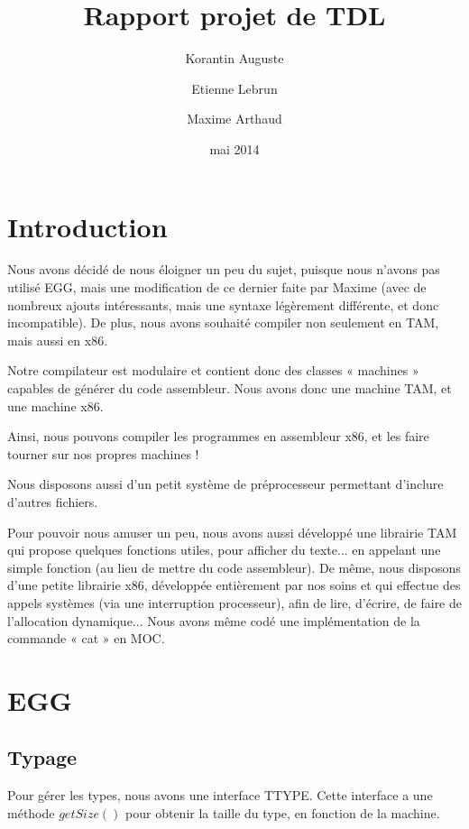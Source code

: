 \documentclass{scrartcl}
\title{Rapport projet de TDL}
\author{Korantin Auguste \and Etienne Lebrun \and Maxime Arthaud}
\date{mai 2014}
\begin{document}
  \maketitle
  \tableofcontents
  \newpage

\section{Introduction}
    Nous avons décidé de nous éloigner un peu du sujet, puisque nous
    n'avons pas utilisé EGG, mais une modification de ce dernier faite
    par Maxime (avec de nombreux ajouts intéressants, mais une syntaxe
    légèrement différente, et donc incompatible).
    De plus, nous avons souhaité compiler non seulement en TAM,
    mais aussi en x86.

    Notre compilateur est modulaire et contient donc des classes « machines » capables de générer du code
    assembleur. Nous avons donc une machine TAM, et une machine x86.

    Ainsi, nous pouvons compiler les programmes en assembleur x86, et les faire tourner sur nos
    propres machines !

    Nous disposons aussi d'un petit système de préprocesseur permettant d'inclure d'autres fichiers.
    
    Pour pouvoir nous amuser un peu, nous avons aussi développé une librairie
    TAM qui propose quelques fonctions utiles, pour afficher du texte... en
    appelant une simple fonction (au lieu de mettre du code assembleur).
    De même, nous disposons d'une petite librairie x86, développée entièrement
    par nos soins et qui effectue des appels systèmes (via une interruption processeur),
    afin de lire, d'écrire, de faire de l'allocation dynamique...
    Nous avons même codé une implémentation de la commande « cat » en MOC.

\section{EGG}

\subsection{Typage}
Pour gérer les types, nous avons une interface TTYPE.
Cette interface a une méthode $getSize()$ pour obtenir la taille du type, en fonction de la machine.
\end{document}
